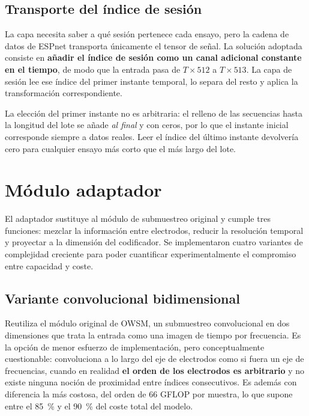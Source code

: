 \subsection{Transporte del índice de sesión}

La capa necesita saber a qué sesión pertenece cada ensayo, pero la cadena de datos de ESPnet transporta únicamente el tensor de señal. La solución adoptada consiste en \textbf{añadir el índice de sesión como un canal adicional constante en el tiempo}, de modo que la entrada pasa de $T \times 512$ a $T \times 513$. La capa de sesión lee ese índice del primer instante temporal, lo separa del resto y aplica la transformación correspondiente.

La elección del primer instante no es arbitraria: el relleno de las secuencias hasta la longitud del lote se añade \textit{al final} y con ceros, por lo que el instante inicial corresponde siempre a datos reales. Leer el índice del último instante devolvería cero para cualquier ensayo más corto que el más largo del lote.

\section{Módulo adaptador}
\label{sec:frontend}

El adaptador sustituye al módulo de submuestreo original y cumple tres funciones: mezclar la información entre electrodos, reducir la resolución temporal y proyectar a la dimensión del codificador. Se implementaron cuatro variantes de complejidad creciente para poder cuantificar experimentalmente el compromiso entre capacidad y coste.

\subsection{Variante convolucional bidimensional}

Reutiliza el módulo original de OWSM, un submuestreo convolucional en dos dimensiones que trata la entrada como una imagen de tiempo por frecuencia. Es la opción de menor esfuerzo de implementación, pero conceptualmente cuestionable: convoluciona a lo largo del eje de electrodos como si fuera un eje de frecuencias, cuando en realidad \textbf{el orden de los electrodos es arbitrario} y no existe ninguna noción de proximidad entre índices consecutivos. Es además con diferencia la más costosa, del orden de 66 GFLOP por muestra, lo que supone entre el \SI{85}{\percent} y el \SI{90}{\percent} del coste total del modelo.

